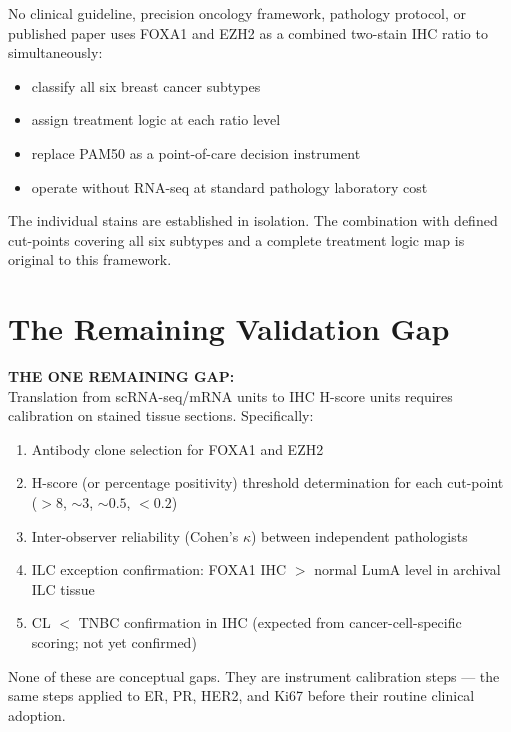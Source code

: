 \documentclass[12pt, a4paper]{article}
\begin{document}
\begin{center}
\colorbox{novelbox}{
\begin{minipage}{0.88\textwidth}
\vspace{0.5em}
No clinical guideline, precision oncology
framework, pathology protocol, or published
paper uses FOXA1 and EZH2 as a combined
two-stain IHC ratio to simultaneously:
\begin{itemize}[noitemsep]
    \item classify all six breast cancer subtypes
    \item assign treatment logic at each ratio level
    \item replace PAM50 as a point-of-care decision
    instrument
    \item operate without RNA-seq at standard
    pathology laboratory cost
\end{itemize}
The individual stains are established in
isolation. The combination with defined
cut-points covering all six subtypes and
a complete treatment logic map is original
to this framework.
\vspace{0.5em}
\end{minipage}}
\end{center}

\section{The Remaining Validation Gap}

\begin{center}
\colorbox{gapbox}{
\begin{minipage}{0.88\textwidth}
\vspace{0.5em}
\textbf{THE ONE REMAINING GAP:}\\[0.4em]
Translation from scRNA-seq/mRNA units to
IHC H-score units requires calibration on
stained tissue sections. Specifically:
\begin{enumerate}[noitemsep]
    \item Antibody clone selection for
    FOXA1 and EZH2
    \item H-score (or percentage positivity)
    threshold determination for each cut-point
    ($>8$, ${\sim}3$, ${\sim}0.5$, $<0.2$)
    \item Inter-observer reliability
    (Cohen's $\kappa$) between independent
    pathologists
    \item ILC exception confirmation:
    FOXA1 IHC $>$ normal LumA level in
    archival ILC tissue
    \item CL $<$ TNBC confirmation in IHC
    (expected from cancer-cell-specific
    scoring; not yet confirmed)
\end{enumerate}
None of these are conceptual gaps. They are
instrument calibration steps --- the same
steps applied to ER, PR, HER2, and Ki67
before their routine clinical adoption.
\vspace{0.5em}
\end{minipage}}
\end{center}
\end{document}
